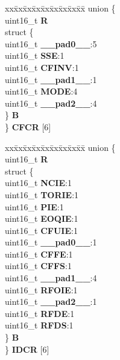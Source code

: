 \begin{DoxyCompactItemize}
\begin{tabbing}
\end{tabbing}\item 
\mbox{\label{structEQADC__tag_a772460ed4d5e81ce3d1f806a5481a0f8}} 
\begin{tabbing}
xx\=xx\=xx\=xx\=xx\=xx\=xx\=xx\=xx\=\kill
union \{\\
\>uint16\_t {\bfseries R}\\
\>struct \{\\
\>\>uint16\_t {\bfseries \_\_pad0\_\_}:5\\
\>\>uint16\_t {\bfseries SSE}:1\\
\>\>uint16\_t {\bfseries CFINV}:1\\
\>\>uint16\_t {\bfseries \_\_pad1\_\_}:1\\
\>\>uint16\_t {\bfseries MODE}:4\\
\>\>uint16\_t {\bfseries \_\_pad2\_\_}:4\\
\>\} {\bfseries B}\\
\} {\bfseries CFCR} \mbox{[}6\mbox{]}\\

\end{tabbing}\item 
\mbox{\label{structEQADC__tag_a915c9a533a861413195a16197d6d2871}} 
\begin{tabbing}
xx\=xx\=xx\=xx\=xx\=xx\=xx\=xx\=xx\=\kill
union \{\\
\>uint16\_t {\bfseries R}\\
\>struct \{\\
\>\>uint16\_t {\bfseries NCIE}:1\\
\>\>uint16\_t {\bfseries TORIE}:1\\
\>\>uint16\_t {\bfseries PIE}:1\\
\>\>uint16\_t {\bfseries EOQIE}:1\\
\>\>uint16\_t {\bfseries CFUIE}:1\\
\>\>uint16\_t {\bfseries \_\_pad0\_\_}:1\\
\>\>uint16\_t {\bfseries CFFE}:1\\
\>\>uint16\_t {\bfseries CFFS}:1\\
\>\>uint16\_t {\bfseries \_\_pad1\_\_}:4\\
\>\>uint16\_t {\bfseries RFOIE}:1\\
\>\>uint16\_t {\bfseries \_\_pad2\_\_}:1\\
\>\>uint16\_t {\bfseries RFDE}:1\\
\>\>uint16\_t {\bfseries RFDS}:1\\
\>\} {\bfseries B}\\
\} {\bfseries IDCR} \mbox{[}6\mbox{]}\\


\end{tabbing}
\end{DoxyCompactItemize}
